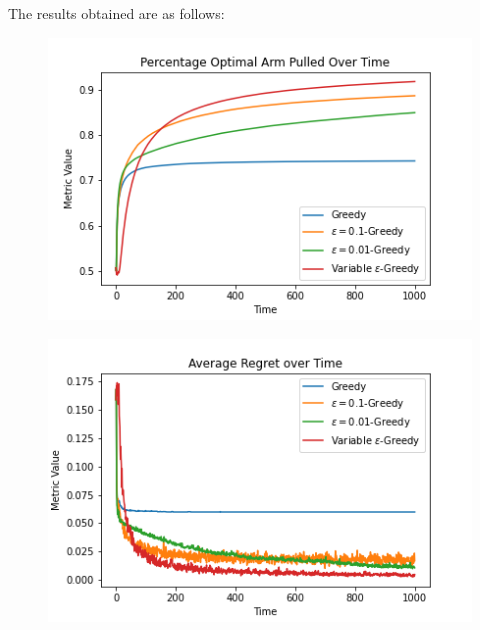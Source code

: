 \documentclass{article}
\begin{document}
		The results obtained are as follows:
		
		\begin{figure}[H]
		\graphicspath{ {../Experiments/Bernoulli_5_All/} }
		\centering
		\begin{minipage}{.5\textwidth}
		  \centering
		  \includegraphics[width=\linewidth]{Percentage_Optimal_Arm_Pulled_Over_Time.png}
		  \label{fig:test1}
		\end{minipage}%
		\begin{minipage}{.5\textwidth}
		  \centering
		  \includegraphics[width=\linewidth]{Average_Regret_over_Time.png}
		  \label{fig:test2}
		\end{minipage}
		\end{figure}
		
\end{document}
